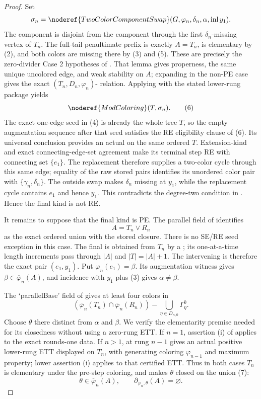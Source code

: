 \begin{proof}
Set
\[
 \sigma_n=\noderef{TwoColorComponentSwap}
       (G,\varphi_n,\delta_n,\alpha,\operatorname{inl}y_1).
\]
The component is disjoint from the component through the first
$\delta_n$-missing vertex of $T_n$.  The full-tail penultimate prefix
is exactly $A=T_n$, is elementary by (2), and both colors are missing
there by (3) and (5).  These are precisely the zero-divider Case 2
hypotheses of .  That lemma gives properness,
the same unique uncolored edge, and weak stability on $A$; expanding
 in the non-PE case gives the exact
$(T_n,D_n,\varphi_n)$- relation.  Applying
 with the stated lower-rung package yields
\[
                         \noderef{ModColoring}(T,\sigma_n).    \tag{6}
\]
The exact one-edge seed in (4) is already the whole tree $T$, so the
empty augmentation sequence after that seed satisfies the RE
eligibility clause of (6).  Its universal conclusion provides an
actual  on the same ordered
$T$.  Extension-kind and exact connecting-edge-set agreement make its
terminal step RE with connecting set $\{e_1\}$.  The replacement
 therefore supplies a
two-color cycle through this same edge; equality of the raw stored
pairs identifies its unordered color pair with
$\{\gamma_n,\delta_n\}$.  The outside swap makes $\delta_n$ missing at
$y_1$, while the replacement cycle contains $e_1$ and hence $y_1$.
This contradicts the degree-two condition in
.  Hence the final kind is not RE.

It remains to suppose that the final kind is PE.  The parallel field of
 identifies
\[
                         A=T_n\vee R_n                        \tag{7}
\]
as the exact ordered union with the stored closure.  There is no SE/RE
seed exception in this case.  The final  is
obtained from $T_n$ by a
; its one-at-a-time length
increments pass through $|A|$ and $|T|=|A|+1$.  The intervening
 is therefore the exact pair
$(e_1,y_1)$.  Put $\varphi_n(e_1)=\beta$.  Its augmentation witness
gives $\beta\in\overline\varphi_n(A)$, and incidence with $y_1$ plus
(3) gives $\alpha\ne\beta$.

The `parallelBase' field of  gives at least four
colors in
\[
 (\overline\varphi_n(T_n)\cap\overline\varphi_n(R_n))
       -\bigcup_{\eta\in D_{n,0}}\Gamma^0_\eta.
\]
Choose $\theta$ there distinct from $\alpha$ and $\beta$.  We verify
the elementarity premise needed for its closedness without using a
zero-rung ETT.  If $n=1$, assertion (i) of
 applies to the exact rounds-one data.  If
$n>1$,  at rung $n-1$ gives an actual
positive lower-rung ETT displayed on $T_n$, with generating coloring
$\varphi_{n-1}$ and maximum property; lower assertion (i) applies to
that certified ETT.  Thus in both cases $T_n$ is elementary under the
pre-step coloring, and  makes
$\theta$ closed on the union (7):
\[
 \theta\in\overline\varphi_n(A),\qquad
 \partial_{\varphi_n,\theta}(A)=\varnothing.                 \tag{8}
\]


\end{proof}

